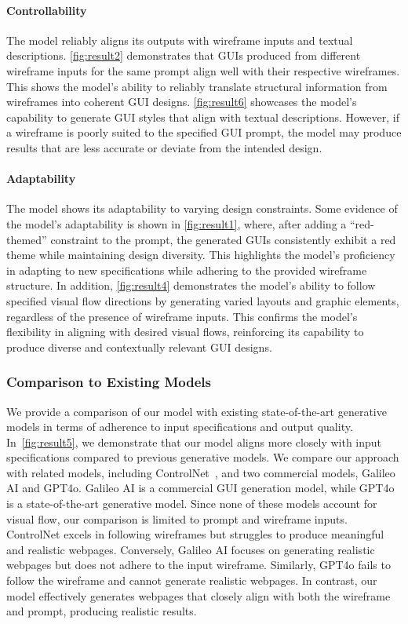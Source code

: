\paragraph{Controllability} 

The model reliably aligns its outputs with wireframe inputs and textual descriptions.
\autoref{fig:result2} demonstrates that GUIs produced from different wireframe inputs for the same prompt align well with their respective wireframes. This shows the model’s ability to reliably translate structural information from wireframes into coherent GUI designs.
%
\autoref{fig:result6} showcases the model’s capability to generate GUI styles that align with textual descriptions. However, if a wireframe is poorly suited to the specified GUI prompt, the model may produce results that are less accurate or deviate from the intended design.

\paragraph{Adaptability} 

The model shows its adaptability to varying design constraints. 
Some evidence of the model’s adaptability is shown in \autoref{fig:result1}, where, after adding a ``red-themed'' constraint to the prompt, the generated GUIs consistently exhibit a red theme while maintaining design diversity. This highlights the model's proficiency in adapting to new specifications while adhering to the provided wireframe structure.
%
In addition, \autoref{fig:result4} demonstrates the model’s ability to follow specified visual flow directions by generating varied layouts and graphic elements, regardless of the presence of wireframe inputs. This confirms the model’s flexibility in aligning with desired visual flows, reinforcing its capability to produce diverse and contextually relevant GUI designs.



\subsubsection{Comparison to Existing Models}

We provide a comparison of our model with existing state-of-the-art generative models in terms of adherence to input specifications and output quality.
In~\autoref{fig:result5}, we demonstrate that our model aligns more closely with input specifications compared to previous generative models. We compare our approach with related models, including ControlNet~\cite{controlnet}, and two commercial models, Galileo AI and GPT4o. Galileo AI is a commercial GUI generation model, while GPT4o is a state-of-the-art generative model. Since none of these models account for visual flow, our comparison is limited to prompt and wireframe inputs.
%
ControlNet excels in following wireframes but struggles to produce meaningful and realistic webpages. Conversely, Galileo AI focuses on generating realistic webpages but does not adhere to the input wireframe. Similarly, GPT4o fails to follow the wireframe and cannot generate realistic webpages. In contrast, our model effectively generates webpages that closely align with both the wireframe and prompt, producing realistic results.

